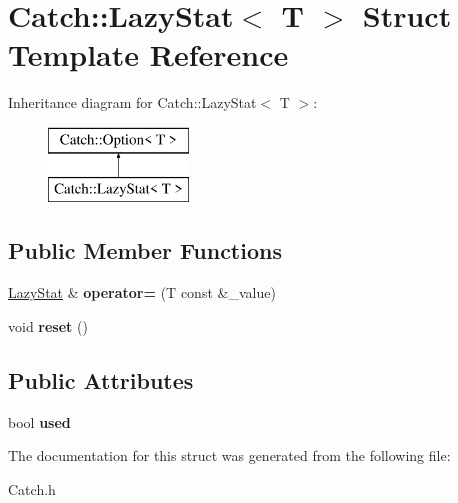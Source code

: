 \hypertarget{struct_catch_1_1_lazy_stat}{\section{Catch\-:\-:Lazy\-Stat$<$ T $>$ Struct Template Reference}
\label{struct_catch_1_1_lazy_stat}
}
Inheritance diagram for Catch\-:\-:Lazy\-Stat$<$ T $>$\-:\begin{figure}[H]
\begin{center}
\leavevmode
\includegraphics[height=2.000000cm]{struct_catch_1_1_lazy_stat}
\end{center}
\end{figure}
\subsection*{Public Member Functions}
\begin{DoxyCompactItemize}
\item 
\hypertarget{struct_catch_1_1_lazy_stat_af8e1c0c8b1b1975a515b190618f25b31}{\hyperlink{struct_catch_1_1_lazy_stat}{Lazy\-Stat} \& {\bfseries operator=} (T const \&\-\_\-value)}\label{struct_catch_1_1_lazy_stat_af8e1c0c8b1b1975a515b190618f25b31}

\item 
\hypertarget{struct_catch_1_1_lazy_stat_a535947bbc846868903cc960e747d9e03}{void {\bfseries reset} ()}\label{struct_catch_1_1_lazy_stat_a535947bbc846868903cc960e747d9e03}

\end{DoxyCompactItemize}
\subsection*{Public Attributes}
\begin{DoxyCompactItemize}
\item 
\hypertarget{struct_catch_1_1_lazy_stat_a3f68d716a1e972df47dc43b4d402124a}{bool {\bfseries used}}\label{struct_catch_1_1_lazy_stat_a3f68d716a1e972df47dc43b4d402124a}

\end{DoxyCompactItemize}


The documentation for this struct was generated from the following file\-:\begin{DoxyCompactItemize}
\item 
Catch.\-h\end{DoxyCompactItemize}
